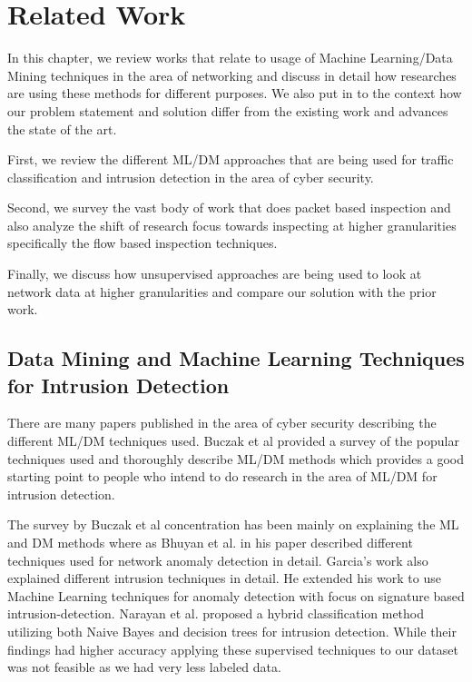 
\chapter{Related Work}

In this chapter, we review works that relate to usage of Machine Learning/Data Mining techniques in the area of networking and discuss in detail how researches are using these methods for different purposes. We also put in to the context how our problem statement and solution differ from the existing work and advances the state of the art.

First, we review the different ML/DM approaches that are being used for traffic classification and intrusion detection in the area of cyber security.

Second, we survey the vast body of work that does packet based inspection and also analyze the shift of research focus towards inspecting at higher granularities specifically the flow based inspection techniques.

Finally, we discuss how unsupervised approaches are being used to look at network data at higher granularities and compare our solution with the prior work. 



\section{Data Mining and Machine Learning Techniques for Intrusion Detection}

There are many papers published in the area of cyber security describing the different ML/DM techniques used. Buczak et al \cite{buczak2016survey} provided a survey of  the popular techniques used and thoroughly describe ML/DM methods which provides a good starting point to people who intend to do research in the area of ML/DM for intrusion detection.

The survey by Buczak et al \cite{buczak2016survey} concentration has been mainly on explaining the ML and DM methods where as Bhuyan et al. \cite{bhuyan2014network} in his paper described different techniques used for network anomaly detection in detail. Garcia's work \cite{garcia2009anomaly} also explained different intrusion techniques in detail. He extended his work to  use Machine Learning techniques for anomaly detection with focus on signature based intrusion-detection.
Narayan et al. \cite{peddabachigari2007modeling} proposed a hybrid classification method utilizing both Naive Bayes and decision trees for intrusion detection. While their findings had higher accuracy applying these supervised techniques to our dataset was not feasible as we had very less labeled data.

